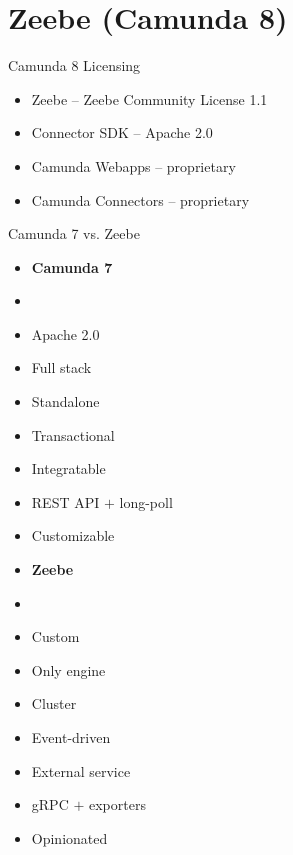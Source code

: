 \documentclass[12pt,aspectratio=169]{beamer}
\begin{document}
\section{Zeebe (Camunda 8)}


\begin{frame}{Camunda 8 Licensing}
\begin{itemize}
\item Zeebe – Zeebe Community License 1.1
\item Connector SDK – Apache 2.0
\item Camunda Webapps – proprietary
\item Camunda Connectors – proprietary
\end{itemize}
\end{frame}

\begin{frame}{Camunda 7 vs. Zeebe}
\par
\vspace{0.5cm}
\par
\begin{minipage}{0.5\textwidth}
\begin{itemize}
    \item[] \textbf{Camunda 7}
    \item[]
    \item Apache 2.0
    \item Full stack
    \item Standalone
    \item Transactional
    \item Integratable
    \item REST API $+$ long-poll
    \item Customizable
\end{itemize}
\end{minipage}
\begin{minipage}{0.45\textwidth}
\begin{itemize}
    \item[] \textbf{Zeebe}
    \item[]
    \item Custom
    \item Only engine
    \item Cluster
    \item Event-driven
    \item External service
    \item gRPC $+$ exporters
    \item Opinionated
\end{itemize}
\end{minipage}
\end{frame}
\end{document}
